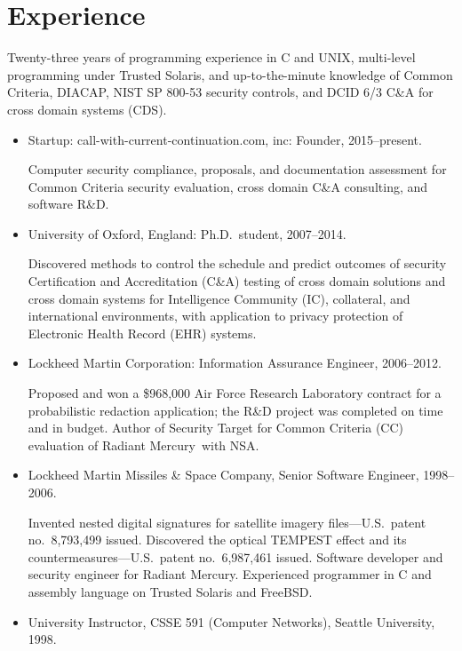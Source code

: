 \section*{Experience}

\vspace{-2mm}
Twenty-three years of programming experience in C and UNIX, multi-level
programming under Trusted Solaris, and
up-to-the-minute knowledge of Common Criteria, DIACAP, NIST SP 800-53
security controls, and DCID 6/3 C\&A for cross domain systems (CDS).

\begin{itemize}
    \item Startup: call-with-current-continuation.com, inc: Founder, 2015--present.
        \vspace{-2mm}
        \begin{myquote}
            Computer security compliance, proposals, and
            documentation assessment for Common Criteria security
            evaluation, cross domain C\&A consulting, and software
            R\&D.
        \end{myquote}

	\item University of Oxford, England: Ph.D.\ student, 2007--2014.
        \vspace{-2mm}
		\begin{myquote}
            Discovered methods to control the schedule and predict
            outcomes of security Certification and Accreditation (C\&A)
            testing of cross domain solutions and cross domain systems for
            Intelligence Community (IC), collateral, and international
            environments, with application to privacy protection
            of Electronic Health Record (EHR) systems.
		\end{myquote}

	\item Lockheed Martin Corporation: Information Assurance Engineer, 2006--2012.
		\vspace{-2mm}
		\begin{myquote}
            Proposed and won a \$968,000 Air Force Research Laboratory
            contract for a probabilistic redaction application; the
            R\&D project was completed on time and in budget. Author of
            Security Target for Common Criteria (CC) evaluation of Radiant
            Mercury\rmtrademark\ with NSA.
		\end{myquote}

	\item Lockheed Martin Missiles \& Space Company, Senior Software Engineer, 1998--2006.
		\vspace{-2mm}
		\begin{myquote}
            Invented nested digital signatures for satellite imagery
            files---U.S.\ patent no.~8,793,499 issued. Discovered the
            optical TEMPEST effect and its countermeasures---U.S.\ patent
            no.~6,987,461 issued. Software developer and security engineer
            for Radiant Mercury\rmtrademark. Experienced programmer in C
            and assembly language on Trusted Solaris and FreeBSD.
		\end{myquote}

	\item University Instructor, CSSE 591 (Computer Networks), Seattle University, 1998.
\end{itemize}

